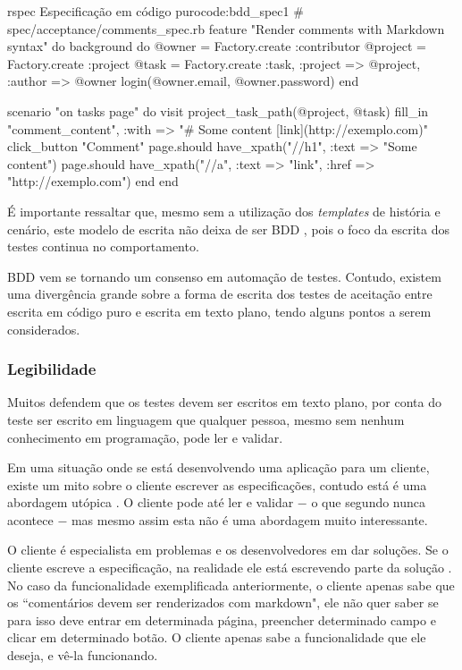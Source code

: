 \begin{mycode}{rspec}%
{Especificação em código puro}{code:bdd_spec1}
# spec/acceptance/comments_spec.rb
feature "Render comments with Markdown syntax" do
  background do
    @owner = Factory.create :contributor
    @project = Factory.create :project
    @task = Factory.create :task, :project => @project, :author => @owner
    login(@owner.email, @owner.password)
  end

  scenario "on tasks page" do
    visit project_task_path(@project, @task)
    fill_in "comment_content", :with => "# Some content [link](http://exemplo.com)"
    click_button "Comment"
    page.should have_xpath("//h1", :text => "Some content")
    page.should have_xpath("//a", :text => "link", :href => "http://exemplo.com")
  end
end
\end{mycode}

É importante ressaltar que, mesmo sem a utilização dos \textit{templates} de história e cenário, este modelo de escrita não deixa de ser BDD \cite{BDDSolis}, pois o foco da escrita dos testes continua no comportamento.

BDD vem se tornando um consenso em automação de testes. Contudo, existem uma divergência grande sobre a forma de escrita dos testes de aceitação entre escrita em código puro e escrita em texto plano, tendo alguns pontos a serem considerados.


\subsubsection{Legibilidade}
\label{ssub:legibilidade}

Muitos defendem que os testes devem ser escritos em texto plano, por conta do teste ser escrito em linguagem que qualquer pessoa, mesmo sem nenhum conhecimento em programação, pode ler e validar.

Em uma situação onde se está desenvolvendo uma aplicação para um cliente, existe um mito sobre o cliente escrever as especificações, contudo está é uma abordagem utópica \cite{SteakOverCucumber, CucumberForVegetarians, ClientsWritingCucumber}. O cliente pode até ler e validar $-$ o que segundo  nunca acontece $-$ mas mesmo assim esta não é uma abordagem muito interessante.

O cliente é especialista em problemas e os desenvolvedores em dar soluções. Se o cliente escreve a especificação, na realidade ele está escrevendo parte da solução \cite{SteakOverCucumber}. No caso da funcionalidade exemplificada anteriormente, o cliente apenas sabe que os ``comentários devem ser renderizados com markdown", ele não quer saber se para isso deve entrar em determinada página, preencher determinado campo e clicar em determinado botão. O cliente apenas sabe a funcionalidade que ele deseja, e vê-la funcionando.

